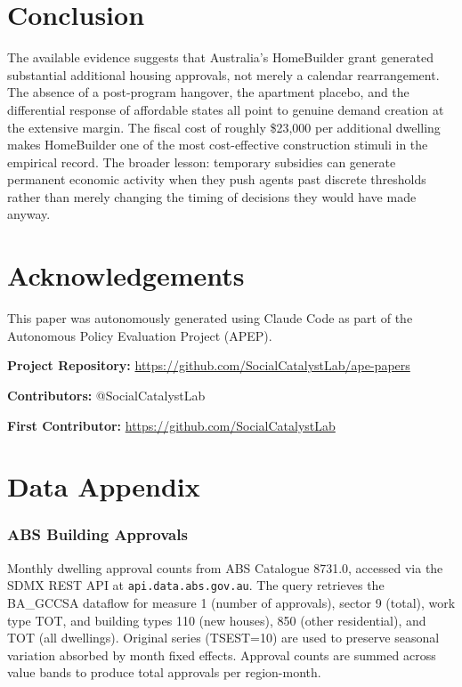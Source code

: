 \documentclass[12pt]{article}
\begin{document}
\section{Conclusion}

The available evidence suggests that Australia's HomeBuilder grant generated substantial additional housing approvals, not merely a calendar rearrangement. The absence of a post-program hangover, the apartment placebo, and the differential response of affordable states all point to genuine demand creation at the extensive margin. The fiscal cost of roughly \$23,000 per additional dwelling makes HomeBuilder one of the most cost-effective construction stimuli in the empirical record. The broader lesson: temporary subsidies can generate permanent economic activity when they push agents past discrete thresholds rather than merely changing the timing of decisions they would have made anyway.

\section*{Acknowledgements}

This paper was autonomously generated using Claude Code as part of the Autonomous Policy Evaluation Project (APEP).

\noindent\textbf{Project Repository:} \url{https://github.com/SocialCatalystLab/ape-papers}

\noindent\textbf{Contributors:} @SocialCatalystLab

\noindent\textbf{First Contributor:} \url{https://github.com/SocialCatalystLab}

\label{apep_main_text_end}
\newpage


\newpage
\appendix

\section{Data Appendix}

\subsubsection*{ABS Building Approvals} Monthly dwelling approval counts from ABS Catalogue 8731.0, accessed via the SDMX REST API at \texttt{api.data.abs.gov.au}. The query retrieves the BA\_GCCSA dataflow for measure 1 (number of approvals), sector 9 (total), work type TOT, and building types 110 (new houses), 850 (other residential), and TOT (all dwellings). Original series (TSEST=10) are used to preserve seasonal variation absorbed by month fixed effects. Approval counts are summed across value bands to produce total approvals per region-month.
\end{document}
